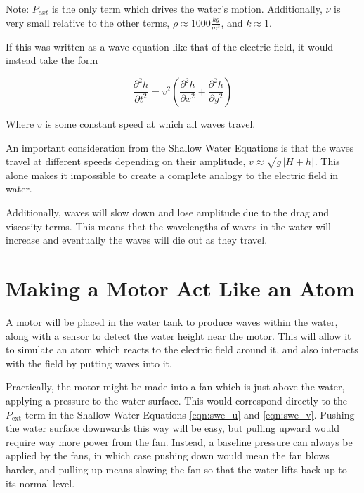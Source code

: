 \documentclass[12pt]{article}
\begin{document}
Note: $P_{ext}$ is the only term which drives the water's motion. Additionally, $\nu$ is very small relative to the other terms, $\rho \approx 1000 \frac{kg}{m^3}$, and $k \approx 1$.

\vspace{0.5cm}

\noindent If this was written as a wave equation like that of the electric field, it would instead take the form

\begin{equation}
    \frac{\partial^2 h}{\partial t^2} = v^2 \left( \frac{\partial^2 h}{\partial x^2} + \frac{\partial^2 h}{\partial y^2} \right)
\end{equation}

Where $v$ is some constant speed at which all waves travel.

\vspace{0.5cm}

\noindent An important consideration from the Shallow Water Equations is that the waves travel at different speeds depending on their amplitude, $v \approx \sqrt{g\,|H+h|}$. This alone makes it impossible to create a complete analogy to the electric field in water.

Additionally, waves will slow down and lose amplitude due to the drag and viscosity terms. This means that the wavelengths of waves in the water will increase and eventually the waves will die out as they travel.

\section{Making a Motor Act Like an Atom}\label{sec:motor-atom}

A motor will be placed in the water tank to produce waves within the water, along with a sensor to detect the water height near the motor. This will allow it to simulate an atom which reacts to the electric field around it, and also interacts with the field by putting waves into it.

Practically, the motor might be made into a fan which is just above the water, applying a pressure to the water surface. This would correspond directly to the $P_{\text{ext}}$ term in the Shallow Water Equations \ref{eqn:swe_u} and \ref{eqn:swe_v}. Pushing the water surface downwards this way will be easy, but pulling upward would require way more power from the fan. Instead, a baseline pressure can always be applied by the fans, in which case pushing down would mean the fan blows harder, and pulling up means slowing the fan so that the water lifts back up to its normal level.
\end{document}
